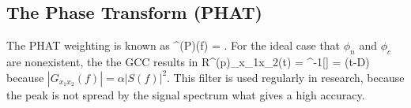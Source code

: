 \subsection{The Phase Transform (PHAT)}
The \ac{PHAT} weighting is known as
\bal
    \Psi^{(P)}(f) = .
\eal
For the ideal case that $\phi_n$ and $\phi_c$ are nonexistent, the the \ac{GCC} results in
\bal
    R^{(p)}_{x_1x_2}(t) = ^{-1}[] = \delta(t-D)
\eal
because $|G_{x_1x_2}(f)| = \alpha |S(f)|^2$.
This filter is used regularly in research, because the peak is not spread by the signal spectrum what gives
a high accuracy.

